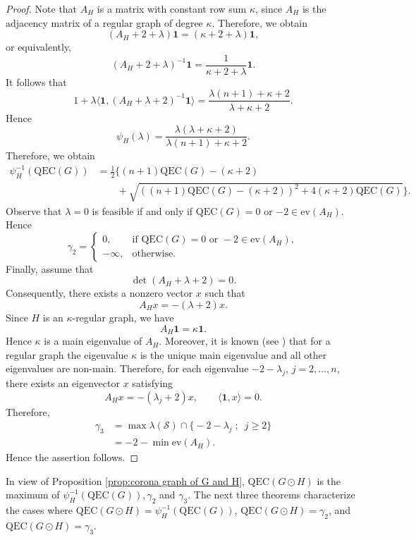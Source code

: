 \documentclass[pdflatex,sn-mathphys-num]{sn-jnl}
\theoremstyle{thmstyleone}%
\theoremstyle{thmstyletwo}%
\theoremstyle{thmstylethree}%
\begin{document}
\begin{proof}
Note that $A_H$ is a matrix with constant row sum $\kappa$, since $A_H$ is the adjacency matrix of a regular graph of degree $\kappa$. Therefore, we obtain
\[
(A_H+2+\lambda)\mathbf{1} = (\kappa+2+\lambda)\mathbf{1},
\]
or equivalently,
\[
(A_H+2+\lambda)^{-1}\mathbf{1} = \frac{1}{\kappa+2+\lambda}\mathbf{1}.
\]
It follows that
\[
1 + \lambda \langle \mathbf{1}, (A_H+\lambda+2)^{-1} \mathbf{1} \rangle
= \frac{\lambda(n+1) + \kappa+2}{\lambda + \kappa+2}.
\]
Hence
\[\psi_{H}(\lambda)=\frac{\lambda(\lambda + \kappa+2)}{\lambda(n+1) + \kappa+2}.\]
Therefore, we obtain
\begin{align*}
\psi_{H}^{-1}(\mathrm{QEC}(G))&=\frac{1}{2}\bigg\{(n+1)\mathrm{QEC}(G)-(\kappa+2)\\& \qquad+\sqrt{\left((n+1)\mathrm{QEC}(G)-(\kappa+2)\right)^2+4(\kappa+2)\mathrm{QEC}(G)}\bigg\}.
\end{align*}
Observe that $\lambda=0$ is feasible if and only if 
$\mathrm{QEC}(G)=0$ or $-2\in \mathrm{ev}(A_H)$. Hence
\[
\gamma_2=
\begin{cases}
0, & \text{if } \mathrm{QEC}(G)=0 \text{ or } -2\in \mathrm{ev}(A_H),\\
-\infty, & \text{otherwise}.
\end{cases}
\]
Finally, assume that 
\[
\det(A_H + \lambda+2) = 0.
\] 
Consequently, there exists a nonzero vector $x$ such that
\[
A_Hx= -(\lambda+2)x.
\] 
Since \(H\) is an \(\kappa\)-regular graph, we have
\[
A_H \mathbf{1} = \kappa \mathbf{1}.
\]
Hence \(\kappa\) is a main eigenvalue of \(A_H\). Moreover, it is known
(see \cite{Rowlinson2007,Cvetkovic-Rowlinson-Simic2010}) that for a regular graph
the eigenvalue \(\kappa\) is the unique main eigenvalue and all other eigenvalues are non-main.
Therefore, for each eigenvalue \(-2-\lambda_j\), \(j=2,\dots,n\), there exists an
eigenvector \(x\) satisfying
\[
A_H x = -(\lambda_j+2) x,
\qquad
\langle \mathbf{1}, x \rangle = 0.
\]
Therefore,
\begin{align*}
\gamma_3
&= \max \lambda(\mathcal S) \cap
\bigl\{ -2-\lambda_j\; ;\;\ j\ge2 \bigr\}\\
&= -2 - \min \mathrm{ev}(A_H).
\end{align*}
Hence the assertion follows.
\end{proof}

In view of Proposition \ref{prop:corona graph of G and H}, 
$\mathrm{QEC}(G\odot H)$ is the maximum of 
$\psi_H^{-1}(\mathrm{QEC}(G)), \gamma_2$ and $\gamma_3$. 
The next three theorems characterize the cases where 
$\mathrm{QEC}(G\odot H)=\psi_H^{-1}(\mathrm{QEC}(G))$, 
$\mathrm{QEC}(G\odot H)=\gamma_2$, and 
$\mathrm{QEC}(G\odot H)=\gamma_3$.
\end{document}
